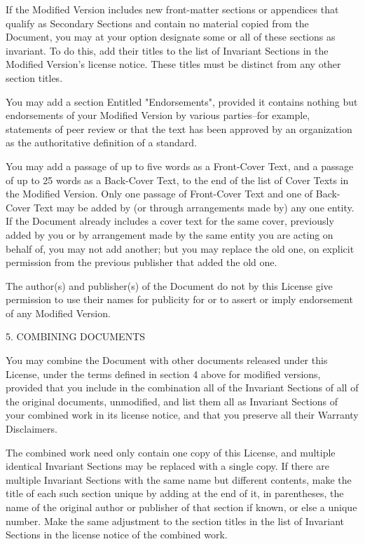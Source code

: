 \documentclass[11pt]{article}
\begin{document}
If the Modified Version includes new front-matter sections or
appendices that qualify as Secondary Sections and contain no material
copied from the Document, you may at your option designate some or all
of these sections as invariant.  To do this, add their titles to the
list of Invariant Sections in the Modified Version's license notice.
These titles must be distinct from any other section titles.

You may add a section Entitled "Endorsements", provided it contains
nothing but endorsements of your Modified Version by various
parties--for example, statements of peer review or that the text has
been approved by an organization as the authoritative definition of a
standard.

You may add a passage of up to five words as a Front-Cover Text, and a
passage of up to 25 words as a Back-Cover Text, to the end of the list
of Cover Texts in the Modified Version.  Only one passage of
Front-Cover Text and one of Back-Cover Text may be added by (or
through arrangements made by) any one entity.  If the Document already
includes a cover text for the same cover, previously added by you or
by arrangement made by the same entity you are acting on behalf of,
you may not add another; but you may replace the old one, on explicit
permission from the previous publisher that added the old one.

The author(s) and publisher(s) of the Document do not by this License
give permission to use their names for publicity for or to assert or
imply endorsement of any Modified Version.


5. COMBINING DOCUMENTS

You may combine the Document with other documents released under this
License, under the terms defined in section 4 above for modified
versions, provided that you include in the combination all of the
Invariant Sections of all of the original documents, unmodified, and
list them all as Invariant Sections of your combined work in its
license notice, and that you preserve all their Warranty Disclaimers.

The combined work need only contain one copy of this License, and
multiple identical Invariant Sections may be replaced with a single
copy.  If there are multiple Invariant Sections with the same name but
different contents, make the title of each such section unique by
adding at the end of it, in parentheses, the name of the original
author or publisher of that section if known, or else a unique number.
Make the same adjustment to the section titles in the list of
Invariant Sections in the license notice of the combined work.
\end{document}
